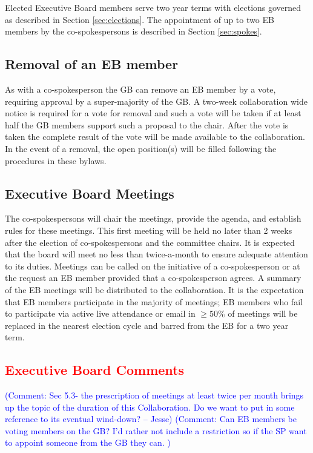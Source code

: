 \documentclass[12pt]{article}
\newcommand{\Comment}[1]{\textcolor{Blue}{(Comment: #1)}}
\begin{document}
Elected Executive Board members serve two year terms with elections governed as described in Section \ref{sec:elections}. The appointment of up to two EB members by the co-spokespersons is described in Section \ref{sec:spokes}. 

\subsection{Removal of an EB member}

As with a co-spokesperson the GB can remove an EB member by a vote, requiring approval by a super-majority of the GB.  A two-week collaboration wide notice is required for a vote for removal and such a vote will be taken if at least half the GB members support such a proposal to the chair. After the vote is taken the complete result of the vote will be made available to the collaboration. In the event of a removal, the open position(s) will be filled following the procedures in these bylaws.

\subsection{Executive Board Meetings}

The co-spokespersons will chair the meetings, provide the agenda, and establish rules for these meetings. This first meeting will be held no later than 2 weeks after the election of co-spokespersons and the committee chairs. It is expected that the board will meet no less than twice-a-month to ensure adequate attention to its duties. Meetings can be called on the initiative of a co-spokesperson or at the request an EB member provided that a co-spokesperson agrees. A summary of the EB meetings will be distributed to the collaboration. It is the expectation that EB members participate in the majority of meetings; EB members who fail to participate via active live attendance or email in $\geq 50\%$ of meetings will be replaced in the nearest election cycle and barred from the EB for a two year term.  

\subsection{\textcolor{red}{Executive Board Comments}}
\Comment{Sec 5.3- the prescription of meetings at least twice per month brings up the topic of the duration of this Collaboration.  Do we want to put in some reference to its eventual wind-down? -- Jesse}
\Comment{Can EB members be voting members on the GB? I'd rather not include a restriction so if the SP want to appoint someone from the GB they can. }
\end{document}
